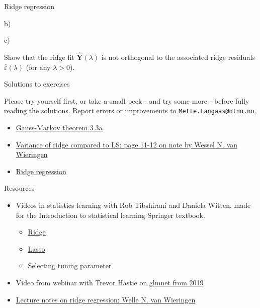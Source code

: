 \documentclass[
  ignorenonframetext,
]{beamer}
\providecommand{\tightlist}{%
  \setlength{\itemsep}{0pt}\setlength{\parskip}{0pt}}
\begin{document}
\begin{frame}
\begin{block}{Ridge regression}
\begin{block}{b)}
\end{block}

\begin{block}{c)}

Show that the ridge fit \(\hat{\mathbf{Y}}(\lambda)\) is not orthogonal
to the associated ridge residuals \(\hat{\varepsilon}(\lambda)\) (for
any \(\lambda > 0\)).

\end{block}

\end{block}

\end{frame}

\begin{frame}{Solutions to exercises}
\protect\hypertarget{solutions-to-exercises}{}

Please try yourself first, or take a small peek - and try some more -
before fully reading the solutions. Report errors or improvements to
\href{mailto:Mette.Langaas@ntnu.no}{\nolinkurl{Mette.Langaas@ntnu.no}}.

\begin{itemize}
\item
  \href{https://github.com/mettelang/MA8701V2021/blob/main/Part1/ELSe33a.pdf}{Gauss-Markov
  theorem 3.3a}
\item
  \href{https://arxiv.org/pdf/1509.09169.pdf}{Variance of ridge compared
  to LS: page 11-12 on note by Wessel N. van Wieringen}
\item
  \href{http://htmlpreview.github.com/?https://github.com/mettelang/MA8701V2021/blob/main/Part1/L2exRR1.html}{Ridge
  regression}
\end{itemize}

\end{frame}

\begin{frame}{Resources}
\protect\hypertarget{resources}{}

\begin{itemize}
\item
  Videos in statistics learning with Rob Tibshirani and Daniela Witten,
  made for the Introduction to statistical learning Springer textbook.

  \begin{itemize}
  \tightlist
  \item
    \href{https://www.youtube.com/watch?v=cSKzqb0EKS0}{Ridge}
  \item
    \href{https://www.youtube.com/watch?v=A5I1G1MfUmA}{Lasso}
  \item
    \href{https://www.youtube.com/watch?v=xMKVUstjXBE}{Selecting tuning
    parameter}
  \end{itemize}
\item
  Video from webinar with Trevor Hastie on
  \href{http://youtu.be/BU2gjoLPfDc}{glmnet from 2019}
\item
  \href{https://arxiv.org/pdf/1509.09169.pdf}{Lecture notes on ridge
  regression: Welle N. van Wieringen}
\end{itemize}

\end{frame}
\end{document}
